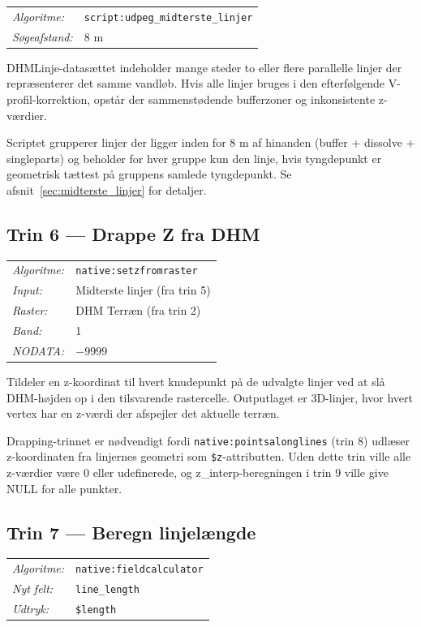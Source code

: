 \begin{tabular}{ll}
  \textit{Algoritme:}   & \texttt{script:udpeg\_midterste\_linjer} \\
  \textit{Søgeafstand:} & 8 m \\
\end{tabular}

\medskip
DHMLinje-datasættet indeholder mange steder to eller flere parallelle linjer der
repræsenterer det samme vandløb. Hvis alle linjer bruges i den efterfølgende
V-profil-korrektion, opstår der sammenstødende bufferzoner og inkonsistente
z-værdier.

Scriptet grupperer linjer der ligger inden for 8 m af hinanden (buffer +
dissolve + singleparts) og beholder for hver gruppe kun den linje, hvis
tyngdepunkt er geometrisk tættest på gruppens samlede tyngdepunkt. Se
afsnit~\ref{sec:midterste_linjer} for detaljer.

\subsection{Trin 6 — Drappe Z fra DHM}

\begin{tabular}{ll}
  \textit{Algoritme:} & \texttt{native:setzfromraster} \\
  \textit{Input:}     & Midterste linjer (fra trin 5) \\
  \textit{Raster:}    & DHM Terræn (fra trin 2) \\
  \textit{Band:}      & 1 \\
  \textit{NODATA:}    & $-9999$ \\
\end{tabular}

\medskip
Tildeler en z-koordinat til hvert knudepunkt på de udvalgte linjer ved at slå
DHM-højden op i den tilsvarende rastercelle. Outputlaget er 3D-linjer, hvor
hvert vertex har en z-værdi der afspejler det aktuelle terræn.

Drapping-trinnet er nødvendigt fordi \texttt{native:pointsalonglines} (trin 8)
udlæser z-koordinaten fra linjernes geometri som \texttt{\$z}-attributten.
Uden dette trin ville alle z-værdier være 0 eller udefinerede, og
z\_interp-beregningen i trin 9 ville give NULL for alle punkter.

\subsection{Trin 7 — Beregn linjelængde}

\begin{tabular}{ll}
  \textit{Algoritme:} & \texttt{native:fieldcalculator} \\
  \textit{Nyt felt:}  & \texttt{line\_length} \\
  \textit{Udtryk:}    & \texttt{\$length} \\
\end{tabular}

